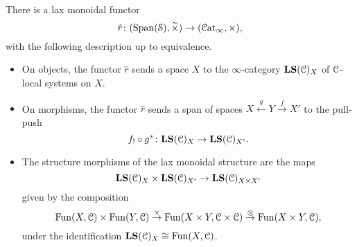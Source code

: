 \documentclass[main.tex]{subfiles}
\begin{document}
\begin{corollary}
  There is a lax monoidal functor
  \begin{equation*}
    \hat{r}\colon (\mathrm{Span}(\mathcal{S}), \widetilde{\times}) \to (\mathcal{C}\mathrm{at}_{\infty}, \times),
  \end{equation*}
  with the following description up to equivalence.
  \begin{itemize}
    \item On objects, the functor $\hat{r}$ sends a space $X$ to the $\infty$-category $\mathbf{LS}(\mathcal{C})_{X}$ of $\mathcal{C}$-local systems on $X$.

    \item On morphisms, the functor $\hat{r}$ sends a span of spaces $X \overset{g}{\leftarrow} Y \overset{f}{\to} X'$ to the pull-push
      \begin{equation*}
        f_{!} \circ g^{*}\colon \mathbf{LS}(\mathcal{C})_{X} \to \mathbf{LS}(\mathcal{C})_{X'}.
      \end{equation*}

    \item The structure morphisms of the lax monoidal structure are the maps
      \begin{equation*}
        \mathbf{LS}(\mathcal{C})_{X} \times \mathbf{LS}(\mathcal{C})_{X'} \to \mathbf{LS}(\mathcal{C})_{X \times X'}
      \end{equation*}
      given by the composition
      \begin{equation*}
        \mathrm{Fun}(X, \mathcal{C}) \times \mathrm{Fun}(Y, \mathcal{C}) \overset{\times}{\to} \mathrm{Fun}(X \times Y, \mathcal{C} \times \mathcal{C}) \overset{\otimes}{\to} \mathrm{Fun}(X \times Y, \mathcal{C}),
      \end{equation*}
      under the identification $\mathbf{LS}(\mathcal{C})_{X} \cong \mathrm{Fun}(X, \mathcal{C})$.
  \end{itemize}
\end{corollary}
\end{document}
